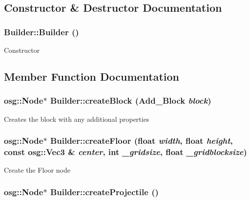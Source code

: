 \subsection{Constructor \& Destructor Documentation}
\hypertarget{class_builder_af8e018e77879c6136e6dabbd5eab0634}{
\subsubsection[{Builder}]{\setlength{\rightskip}{0pt plus 5cm}Builder::Builder ()}}
\label{class_builder_af8e018e77879c6136e6dabbd5eab0634}
Constructor 

\subsection{Member Function Documentation}
\hypertarget{class_builder_acdb4f87505ee535c01b7df7a1ee2755b}{
\subsubsection[{createBlock}]{\setlength{\rightskip}{0pt plus 5cm}osg::Node$\ast$ Builder::createBlock ({\bf Add\_\-Block} {\em block})}}
\label{class_builder_acdb4f87505ee535c01b7df7a1ee2755b}
Creates the block with any additional properties \hypertarget{class_builder_a7c5d028d6996f58b2c45f948bfc6b5ab}{
\subsubsection[{createFloor}]{\setlength{\rightskip}{0pt plus 5cm}osg::Node$\ast$ Builder::createFloor (float {\em width}, \/  float {\em height}, \/  const osg::Vec3 \& {\em center}, \/  int {\em \_\-gridsize}, \/  float {\em \_\-gridblocksize})}}
\label{class_builder_a7c5d028d6996f58b2c45f948bfc6b5ab}
Create the Floor node \hypertarget{class_builder_a24f7e21014e2bb924abd4e2a519a1688}{
\subsubsection[{createProjectile}]{\setlength{\rightskip}{0pt plus 5cm}osg::Node$\ast$ Builder::createProjectile ()}}
